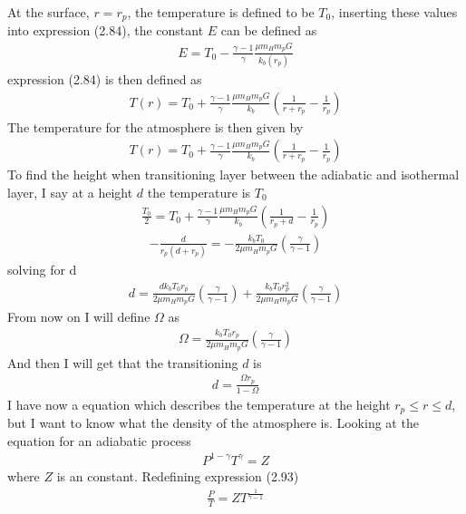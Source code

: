 \documentclass[a4paper,11pt,english]{report}
\begin{document}
At the surface, \(r = r_{p}\), the temperature is defined to be \(T_{0}\),
inserting these values into expression (2.84), the constant \(E\) can be
defined as
\begin{align}
  E = T_{0} - \frac{\gamma -1}{\gamma}\frac{\mu m_{H}m_{p}G}{k_{b}(r_{p})}
\end{align}
expression (2.84) is then defined as
\begin{align}
  T(r) = T_{0} + \frac{\gamma -1}{\gamma}\frac{\mu
  m_{H}m_{p}G}{k_{b}}(\frac{1}{r + r_{p}} - \frac{1}{r_{p}})
\end{align}
The temperature for the atmosphere is then given by
\begin{align}
  T(r) = T_{0} + \frac{\gamma -1}{\gamma}\frac{\mu
  m_{H}m_{p}G}{k_{b}}
  (\frac{1}{r + r_{p}} - \frac{1}{r_{p}})
\end{align}
To find the height when transitioning layer between the adiabatic and
isothermal layer, I say at a height \(d\) the temperature is \(T_{0}\)
\begin{align}
  \frac{T_{0}}{2} = T_{0} + \frac{\gamma -1}{\gamma}\frac{\mu
  m_{H}m_{p}G}{k_{b}}(\frac{1}{r_{p}+d} - \frac{1}{r_{p}})
\end{align}
\begin{align}
  - \frac{d}{r_{p}(d + r_{p})} = - \frac{k_{b}T_{0}}{2\mu m_{H}
  m_{p}G}(\frac{\gamma}{\gamma-1})
\end{align}
solving for d
\begin{align}
  d = \frac{dk_{b}T_{0}r_{p}}{2\mu m_{H} m_{p}G}(\frac{\gamma}{\gamma-1})
  + \frac{k_{b}T_{0}r_{p}^{2}}{2\mu m_{H} m_{p}G}(\frac{\gamma}{\gamma-1})
\end{align}
From now on I will define \(\Omega\) as
\begin{align}
  \Omega = \frac{k_{b}T_{0}r_{p}}{2\mu m_{H} m_{p}G}(\frac{\gamma}{\gamma-1})
\end{align}
And then I will get that the transitioning \(d\) is
\begin{align}
  d = \frac{\Omega r_{p}}{1-\Omega}
\end{align}
I have now a equation which describes the temperature at the height
\(r_{p} \le r \le d\), but I want to know what the density of the atmosphere
is.  Looking at the equation for an adiabatic process
\begin{align}
  P^{1-\gamma}T^{\gamma} = Z
\end{align}
where \(Z\) is an constant. Redefining expression (2.93)
\begin{align}
  \frac{P}{T} = ZT^{\frac{1}{\gamma -1 }}
\end{align}
\end{document}
